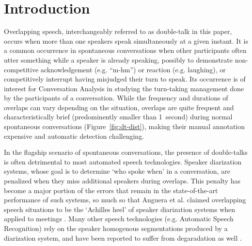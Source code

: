 \documentclass[a4paper]{article}
\begin{document}
\section{Introduction}

Overlapping speech, interchangeably referred to as double-talk in this paper,
occurs when more than one speakers speak simultaneously at a given instant.
It is a common occurrence in spontaneous conversations when
other participants often utter something while a speaker is already speaking,
possibly to demonstrate non-competitive acknowledgement (e.g. ``m-hm'') or reaction (e.g. laughing),
or competitively interrupt having misjudged their turn to speak.
Its occurrence is of interest for Conversation Analysis in studying the
turn-taking management done by the participants of a conversation.
While the frequency and durations of overlaps can vary depending on the situation,
overlaps are quite frequent and characteristically brief (predominently smaller than 1~second)
during normal spontaneous conversations (Figure~\ref{fig:dt-dist}),
making their manual annotation expensive and automatic detection challenging.

In the flagship scenario of spontaneous conversations,
the presence of double-talks is often detrimental to most automated speech technologies.
Speaker diarization systems, whose goal is to determine `who spoke when' in a conversation,
are penalized when they miss additional speakers during overlaps.
This penalty has become a major portion of the errors that remain in the
state-of-the-art performance of such systems,
so much so that Anguera et al. claimed overlapping speech situations to be the `Achilles heel' of
speaker diarization systems when applied to meetings \cite{anguera_speaker_2012}.
Many other speech technologies (e.g. Automatic Speech Recognition)
rely on the speaker homogenous segmentations produced by a diarization system,
and have been reported to suffer from degaradation as well \cite{cetin_speaker_2006,RenalsDistantspeechrecognition2017}.
\end{document}
